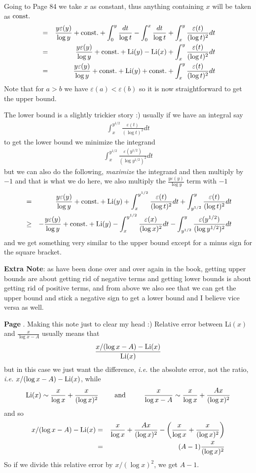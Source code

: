 \documentclass[aps,preprint,preprintnumbers,nofootinbib,showpacs,prd]{revtex4-1}
\newcommand{\ie}{{\it i.e.} }
\newcommand{\nbea}{\begin{eqnarray*}}
\newcommand{\neea}{\end{eqnarray*}}
\begin{document}
Going to Page 84 we take $x$ as constant, thus anything containing $x$ will be taken as ${\rm const.}$
%
\nbea
& = & \frac{y\varepsilon(y)}{\log y} + {\rm const.} + \int_0^y \frac{dt}{\log t} - \int_0^x \frac{dt}{\log t} + \int_x^y \frac{\varepsilon(t)}{(\log t)^2} dt \\
& = & \frac{y\varepsilon(y)}{\log y} + {\rm const.} + {\rm Li}(y) - {\rm Li}(x) + \int_x^y \frac{\varepsilon(t)}{(\log t)^2} dt \\
& = & \frac{y\varepsilon(y)}{\log y} + {\rm const.} + {\rm Li}(y) + {\rm const.} + \int_x^y \frac{\varepsilon(t)}{(\log t)^2} dt
\neea
%
Note that for $a > b$ we have $\varepsilon(a) < \varepsilon(b)$ so it is now straightforward to get the upper bound.

The lower bound is a slightly trickier story :) usually if we have an integral say
%
\nbea
\int_x^{y^{1/2}} \frac{\varepsilon(t)}{(\log t)^2} dt
\neea
%
to get the lower bound we minimize the integrand
%
\nbea
\int_x^{y^{1/2}} \frac{\varepsilon(y^{1/2})}{(\log y^{1/2})^2} dt
\neea
%
but we can also do the following, {\it maximize} the integrand and then multiply by $-1$ and that is what we do here, we also multiply the $\frac{y\varepsilon(y)}{\log y}$ term with $-1$
%
\nbea
& = & \frac{y\varepsilon(y)}{\log y} + {\rm const.} + {\rm Li}(y) + \int_x^{y^{1/2}} \frac{\varepsilon(t)}{(\log t)^2} dt + \int_{y^{1/2}}^y \frac{\varepsilon(t)}{(\log t)^2} dt \\
& \ge & -\frac{y\varepsilon(y)}{\log y} + {\rm const.} + {\rm Li}(y) - \int_x^{y^{1/2}} \frac{\varepsilon(x)}{(\log x)^2} dt - \int_{y^{1/2}}^y \frac{\varepsilon(y^{1/2})}{(\log y^{1/2})^2} dt
\neea
%
and we get something very similar to the upper bound except for a minus sign for the square bracket.

{\bf Extra Note}: as have been done over and over again in the book, getting upper bounds are about getting rid of negative terms and getting lower bounds is about getting rid of positive terms, and from above we also see that we can get the upper bound and stick a negative sign to get a lower bound and I believe vice versa as well.



{\bf Page }. Making this note just to clear my head :) Relative error between Li$(x)$ and $\frac{x}{\log x - A}$ usually means that
%
\nbea
\frac{x/(\log x - A) - {\rm Li}(x)}{{\rm Li}(x)}
\neea
%
but in this case we just want the difference, \ie the absolute error, not the ratio, \ie $x/(\log x - A) - {\rm Li}(x)$, while
%
\nbea
{\rm Li}(x) \sim \frac{x}{\log x} + \frac{x}{(\log x)^2} ~~~~~~~{\rm and}~~~~~~~~\frac{x}{\log x - A} \sim \frac{x}{\log x} + \frac{Ax}{(\log x)^2}
\neea
%
and so
%
\nbea
x/(\log x - A) - {\rm Li}(x) & = & \frac{x}{\log x} + \frac{Ax}{(\log x)^2} - \left (\frac{x}{\log x} + \frac{x}{(\log x)^2} \right ) \\
& = & (A-1)\frac{x}{(\log x)^2}
\neea
%
So if we divide this relative error by $x/(\log x)^2$, we get $A-1$.
\end{document}
